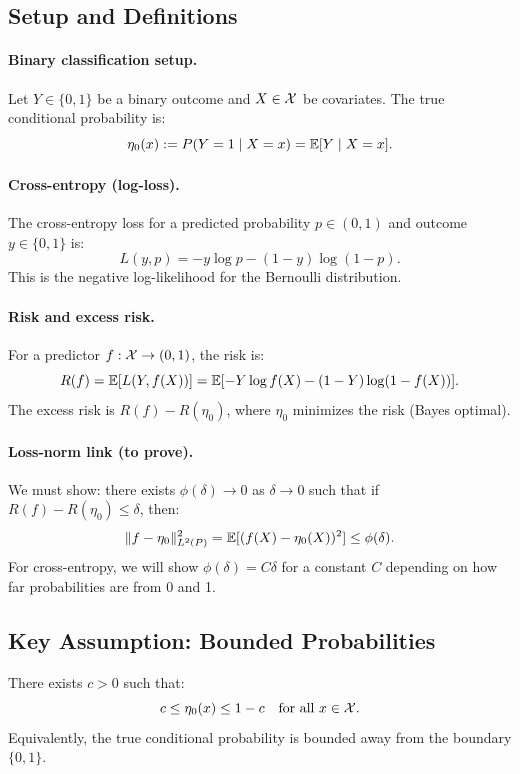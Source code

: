 \documentclass[12pt]{article}
\begin{document}
\subsection{Setup and Definitions}

\paragraph{Binary classification setup.}
Let $Y \in \{0,1\}$ be a binary outcome and $X \in \mathcal{X}$ be covariates. The true conditional probability is:
\[
\eta_0(x) := P(Y = 1 \mid X = x) = \mathbb{E}[Y \mid X = x].
\]

\paragraph{Cross-entropy (log-loss).}
The cross-entropy loss for a predicted probability $p \in (0,1)$ and outcome $y \in \{0,1\}$ is:
\[
L(y, p) = -y \log p - (1-y) \log(1-p).
\]
This is the negative log-likelihood for the Bernoulli distribution.

\paragraph{Risk and excess risk.}
For a predictor $f: \mathcal{X} \to (0,1)$, the risk is:
\[
R(f) = \mathbb{E}[L(Y, f(X))] = \mathbb{E}[-Y \log f(X) - (1-Y) \log(1-f(X))].
\]
The excess risk is $R(f) - R(\eta_0)$, where $\eta_0$ minimizes the risk (Bayes optimal).

\paragraph{Loss-norm link (to prove).}
We must show: there exists $\phi(\delta) \to 0$ as $\delta \to 0$ such that if $R(f) - R(\eta_0) \le \delta$, then:
\[
\|f - \eta_0\|_{L^2(P)}^2 = \mathbb{E}[(f(X) - \eta_0(X))^2] \le \phi(\delta).
\]
For cross-entropy, we will show $\phi(\delta) = C\delta$ for a constant $C$ depending on how far probabilities are from 0 and 1.

\subsection{Key Assumption: Bounded Probabilities}

\begin{assumption}
\label{assump:bounded-probs}
There exists $c > 0$ such that:
\[
c \le \eta_0(x) \le 1-c \quad \text{for all } x \in \mathcal{X}.
\]
Equivalently, the true conditional probability is bounded away from the boundary $\{0, 1\}$.
\end{assumption}
\end{document}
